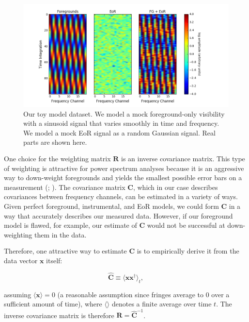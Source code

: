 \documentclass[preprint2,numberedappendix,tighten]{aastex6}  %
\begin{document}
\begin{figure}
	\centering
	\includegraphics[trim={1.5cm 0.2cm 3.5cm 0.3cm},clip,width=\columnwidth]{plots/toy_sigloss1.png}
	\caption{Our toy model dataset. We model a mock foreground-only visibility with a sinusoid signal that varies smoothly in time and frequency. We model a mock EoR signal as a random Gaussian signal. Real parts are shown here.}
	\label{fig:toy_sigloss1}
\end{figure}

One choice for the weighting matrix $\textbf{R}$ is an inverse covariance matrix. This type of weighting is attractive for power spectrum analyses because it is an aggressive way to down-weight foregrounds and yields the smallest possible error bars on a measurement (\citealt{tegmark_et_al1997a}; \citealt{bond_et_al1998}). The covariance matrix $\textbf{C}$, which in our case describes covariances between frequency channels, can be estimated in a variety of ways. Given perfect foreground, instrumental, and EoR models, we could form $\textbf{C}$ in a way that accurately describes our measured data. However, if our foreground model is flawed, for example, our estimate of $\textbf{C}$ would not be successful at down-weighting them in the data. 

Therefore, one attractive way to estimate $\textbf{C}$ is to empirically derive it from the data vector $\textbf{x}$ itself:

\begin{equation}
\hat{\textbf{C}} \equiv \langle\textbf{xx}^{\dagger}\rangle_{t},
\end{equation}

\noindent assuming $\langle\textbf{x}\rangle = 0$ (a reasonable assumption since fringes average to $0$ over a sufficient amount of time), where $\langle \rangle$ denotes a finite average over time $t$. The inverse covariance matrix is therefore $\textbf{R} = \hat{\textbf{C}}^{-1}$. 
\end{document}

